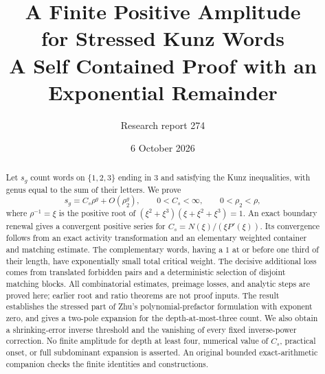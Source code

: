 \documentclass[11pt,letterpaper]{article}
\title{\textbf{A Finite Positive Amplitude\\for Stressed Kunz Words}\\[5pt]
\large A Self Contained Proof with an Exponential Remainder}
\author{Research report 274}\date{6 October 2026}
\theoremstyle{definition}
\begin{document}
\maketitle
\begin{abstract}
Let $s_g$ count words on $\{1,2,3\}$ ending in $3$ and satisfying the Kunz inequalities, with genus equal to the sum of their letters. We prove
\[
s_g=C_s\rho^g+O(\rho_2^g),\qquad 0<C_s<\infty,\qquad 0<\rho_2<\rho,
\]
where $\rho^{-1}=\xi$ is the positive root of
$(\xi^2+\xi^3)(\xi+\xi^2+\xi^3)=1$.
An exact boundary renewal gives a convergent positive series for
$C_s=N(\xi)/(\xi P'(\xi))$. Its convergence follows from an exact activity transformation and an elementary weighted container and matching estimate. The complementary words, having a $1$ at or before one third of their length, have exponentially small total critical weight. The decisive additional loss comes from translated forbidden pairs and a deterministic selection of disjoint matching blocks. All combinatorial estimates, preimage losses, and analytic steps are proved here; earlier root and ratio theorems are not proof inputs. The result establishes the stressed part of Zhu's polynomial-prefactor formulation with exponent zero, and gives a two-pole expansion for the depth-at-most-three count. We also obtain a shrinking-error inverse threshold and the vanishing of every fixed inverse-power correction. No finite amplitude for depth at least four, numerical value of $C_s$, practical onset, or full subdominant expansion is asserted. An original bounded exact-arithmetic companion checks the finite identities and constructions.
\end{abstract}
\end{document}

